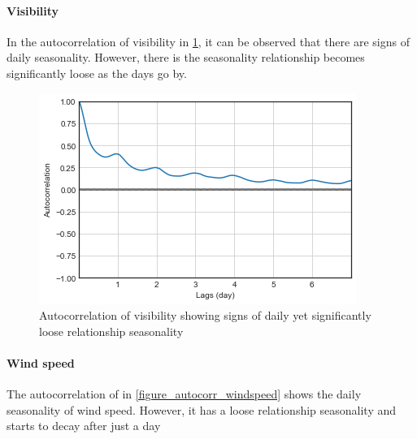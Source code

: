 \paragraph{Visibility}

In the autocorrelation of visibility in \ref{figure_autocorr_visibility}, it can be observed that there are signs of daily seasonality. However, there is the seasonality relationship becomes significantly loose as the days go by. 


\begin{figure}
  \includegraphics[width=\linewidth]
  {figures/figure_autocorr_visibility.png}
  \caption{ Autocorrelation of visibility showing signs of daily yet significantly loose relationship seasonality}
  \label{figure_autocorr_visibility}
\end{figure}

\paragraph{Wind speed}

The autocorrelation of in \ref{figure_autocorr_windspeed} shows the daily seasonality of wind speed. However, it has a loose relationship seasonality  and starts to decay after just a day

